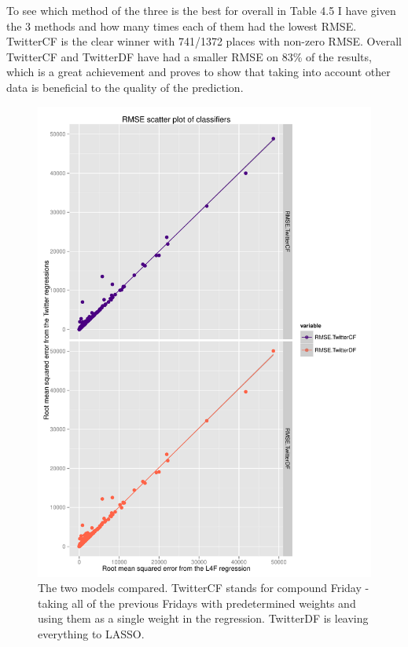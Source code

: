 \documentclass[minf,twoside,singlespacing,parskip,frontabs]{infthesis}
\begin{document}
To see which method of the three is the best for overall in Table 4.5 I have given the 3 methods and how many times each of them had the lowest RMSE. TwitterCF is the clear winner with 741/1372 places with non-zero RMSE. Overall TwitterCF and TwitterDF have had a smaller RMSE on 83\% of the results, which is a great achievement and proves to show that taking into account other data is beneficial to the quality of the prediction. 


\begin{figure}[]
\begin{center}
\includegraphics[scale=0.75]{rmse_scatter_by_reg}
\end{center}
\caption{The two models compared. TwitterCF stands for compound Friday - taking all of the previous Fridays with predetermined weights and using them as a single weight in the regression. TwitterDF is leaving everything to LASSO.}
\label{rmse_scatter_by_reg}
\end{figure}
\end{document}
